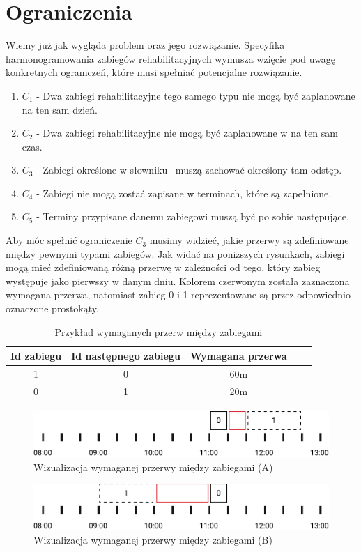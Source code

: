 \section{Ograniczenia}
Wiemy już jak wygląda problem oraz jego rozwiązanie. Specyfika
harmonogramowania zabiegów rehabilitacyjnych wymusza wzięcie pod uwagę
konkretnych ograniczeń, które musi spełniać potencjalne rozwiązanie.
\begin{enumerate}
	\item{$C_1$ - Dwa zabiegi rehabilitacyjne tego samego typu nie mogą być
		zaplanowane na ten sam dzień.}
	\item{$C_2$ - Dwa zabiegi rehabilitacyjne nie mogą być zaplanowane w na ten sam czas.}
	\item{$C_3$ - Zabiegi określone w słowniku \sGap\ muszą zachować określony tam odstęp.}
	\item{$C_4$ - Zabiegi nie mogą zostać zapisane w terminach, które są zapełnione.}
	\item{$C_5$ - Terminy przypisane danemu zabiegowi muszą być po sobie
		następujące.}
\end{enumerate}
Aby móc spełnić ograniczenie $C_3$ musimy widzieć, jakie przerwy są zdefiniowane
między pewnymi typami zabiegów. Jak widać na poniższych rysunkach, zabiegi mogą
mieć zdefiniowaną różną przerwę w zależności od tego, który zabieg występuje
jako pierwszy w danym dniu. Kolorem czerwonym została zaznaczona wymagana
przerwa, natomiast zabieg 0 i 1 reprezentowane są przez odpowiednio oznaczone
prostokąty.
\begin{table}[h]
	\centering
	\begin{tabular}{ | c | c | c | c | c | }
		\hline
		\bfseries Id zabiegu & \bfseries Id następnego zabiegu & \bfseries Wymagana przerwa \\
		\hline
		1 & 0 & 60m \\
		\hline
		0 & 1 & 20m \\
		\hline
	\end{tabular}
	\caption{Przykład wymaganych przerw między zabiegami}
	\label{example-gaps}
\end{table}
\begin{figure}[h]
	\centering
	\includegraphics[width=\textwidth]{gfx/gap_1.pdf}
	\caption{Wizualizacja wymaganej przerwy między zabiegami (A)}
	\label{example-gaps-1}
\end{figure}
\begin{figure}[h]
	\centering
	\includegraphics[width=\textwidth]{gfx/gap_2.pdf}
	\caption{Wizualizacja wymaganej przerwy między zabiegami (B)}
	\label{example-gaps-2}
\end{figure}
\pagebreak
